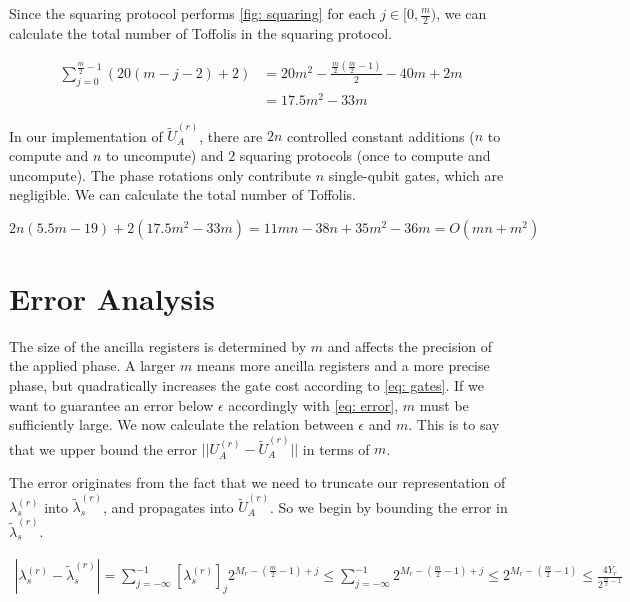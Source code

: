 Since the squaring protocol performs \ref{fig: squaring} for each $j \in [0, \frac{m}{2})$, we can calculate the total number of Toffolis in the squaring protocol.

\begin{equation}
    \begin{split}
        \sum_{j = 0}^{\frac{m}{2} - 1} (20(m - j - 2) + 2) &= 20m^2 - \frac{\frac{m}{2}(\frac{m}{2} - 1)}{2} - 40m + 2m \\
        &= 17.5m^2 - 33m
    \end{split}
\end{equation}

In our implementation of $\tilde{U}_A^{(r)}$, there are $2n$ controlled constant additions ($n$ to compute and $n$ to uncompute) and $2$ squaring protocols (once to compute and uncompute). The phase rotations only contribute $n$ single-qubit gates, which are negligible. We can calculate the total number of Toffolis.

\begin{equation}
    2n(5.5m - 19) + 2(17.5m^2 - 33m) = 11mn - 38n + 35m^2 - 36m = O(mn + m^2) \label{eq: gates}
\end{equation}

\section{Error Analysis}

The size of the ancilla registers is determined by $m$ and affects the precision of the applied phase. A larger $m$ means more ancilla registers and a more precise phase, but quadratically increases the gate cost according to \eqref{eq: gates}. If we want to guarantee an error below $\epsilon$ accordingly with \eqref{eq: error}, $m$ must be sufficiently large. We now calculate the relation between $\epsilon$ and $m$. This is to say that we upper bound the error $||U_A^{(r)} - \tilde{U}_A^{(r)}||$ in terms of $m$.

The error originates from the fact that we need to truncate our representation of $\lambda^{(r)}_s$ into $\tilde{\lambda}^{(r)}_s$, and propagates into $\tilde{U}_A^{(r)}$. So we begin by bounding the error in $\tilde{\lambda}^{(r)}_s$.

\begin{equation}
    \begin{split}
        |\lambda^{(r)}_s - \tilde{\lambda}^{(r)}_s| = \sum_{j = -\infty}^{-1} [\lambda^{(r)}_s]_j2^{M_r - (\frac{m}{2} - 1) + j} \leq \sum_{j = -\infty}^{-1} 2^{M_r - (\frac{m}{2} - 1) + j} \leq 2^{M_r - (\frac{m}{2} - 1)} \leq \frac{4Y_r}{2^{\frac{m}{2} - 1}}
    \end{split}
\end{equation}

